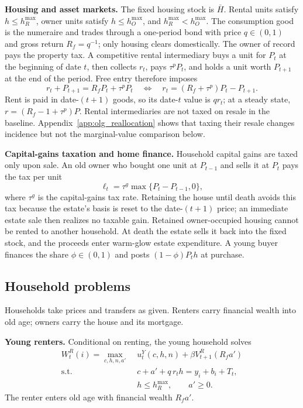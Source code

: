 \textbf{Housing and asset markets.}
The fixed housing stock is $\bar H$.  Rental units satisfy
$h\leq h_R^{\max}$, owner units satisfy $h\leq h_O^{\max}$, and
$h_R^{\max}<h_O^{\max}$.  The consumption good is the numeraire and trades
through a one-period bond with price $q\in(0,1)$ and gross return
$R_f=q^{-1}$; only housing clears domestically.  The owner of record pays the
property tax.  A competitive rental intermediary buys a unit for $P_t$ at the
beginning of date $t$, then collects $r_t$, pays $\tau^pP_t$, and holds a unit
worth $P_{t+1}$ at the end of the period.  Free entry therefore imposes
\begin{equation}
 r_t+P_{t+1}=R_fP_t+\tau^pP_t
 \quad\Longleftrightarrow\quad
 r_t=(R_f+\tau^p)P_t-P_{t+1}.
 \label{eq:olg_rental_user_cost}
\end{equation}
Rent is paid in date-$(t+1)$ goods, so its date-$t$ value is $q r_t$; at a
steady state, $r=(R_f-1+\tau^p)P$.  Rental intermediaries are not taxed on
resale in the baseline.  Appendix~\ref{app:olg_reallocation} shows that taxing
their resale changes incidence but not the marginal-value comparison below.

\textbf{Capital-gains taxation and home finance.}
Household capital gains are taxed only upon sale.  An old owner who bought one
unit at $P_{t-1}$ and sells it at $P_t$ pays the tax per unit
\begin{equation}
 \ell_t=\tau^g\max\{P_t-P_{t-1},0\},
 \label{eq:olg_prices}
\end{equation}
where $\tau^g$ is the capital-gains tax rate.  Retaining the house until death
avoids this tax because the estate's basis is reset to the date-$(t+1)$ price;
an immediate estate sale then realizes no taxable gain.  Retained
owner-occupied housing cannot be rented to another household.  At death the
estate sells it back into the fixed stock, and the proceeds enter warm-glow
estate expenditure.  A young buyer finances the share $\phi\in(0,1)$ and posts
$(1-\phi)P_th$ at purchase.

\subsection{Household problems}

Households take prices and transfers as given.  Renters carry financial wealth
into old age; owners carry the house and its mortgage.

\textbf{Young renters.}
Conditional on renting, the young household solves
\begin{align}
 W_t^R(i)=\max_{c,h,n,a'}\;&u_t^Y(c,h,n)+\beta V_{t+1}^R(R_fa') \\
 \text{s.t.}\quad&
 c+a'+q\,r_th=y_i+b_i+T_t,\nonumber\\[-2pt]
 &h\leq h_R^{\max},\qquad a'\geq0.
 \label{eq:olg_young_renter}
\end{align}
The renter enters old age with financial wealth $R_fa'$.

